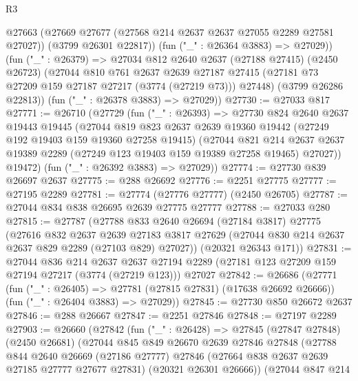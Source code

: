 \begin{lexlean}{R3}
\begin{coremodule}
        @27663
          (@27669 @27677 (@27568 @214 @2637 @2637 @27055 @2289 @27581 @27027))
          (@3799 @26301 @22817))
        (fun ("_" : @26364 @3883) => @27029))
      (fun ("_" : @26379) =>
      @27034
        @812
        @2640
        @2637
        (@27188 @27415)
        (@2450 @26723)
        (@27044
          @810
          @761
          @2637
          @2639
          @27187
          @27415
          (@27181 @73 @27209 @159 @27187 @27217 (@3774 (@27219 @73)))
          @27448)
        (@3799 @26286 @22813))
      (fun ("_" : @26378 @3883) => @27029))
@27730 := @27033 @817
@27771 := @26710
    (@27729
      (fun ("_" : @26393) =>
      @27730
        @824
        @2640
        @2637
        @19443
        @19445
        (@27044
          @819
          @823
          @2637
          @2639
          @19360
          @19442
          (@27249 @192 @19403 @159 @19360 @27258 @19415)
          (@27044
            @821
            @214
            @2637
            @2637
            @19389
            @2289
            (@27249 @123 @19403 @159 @19389 @27258 @19465)
            @27027))
        @19472)
      (fun ("_" : @26392 @3883) => @27029))
@27774 := @27730 @839 @26697 @2637
@27775 := @288 @26692
@27776 := @2251 @27775
@27777 := @27195 @2289
@27781 := @27774 (@27776 @27777) (@2450 @26705)
@27787 := @27044 @834 @838 @26695 @2639 @27775 @27777
@27788 := @27033 @280
@27815 := @27787
    (@27788
      @833
      @2640
      @26694
      (@27184 @3817)
      @27775
      (@27616
        @832
        @2637
        @2639
        @27183
        @3817
        @27629
        (@27044 @830 @214 @2637 @2637 @829 @2289 (@27103 @829) @27027))
      (@20321 @26343 @171))
@27831 := @27044
    @836
    @214
    @2637
    @2637
    @27194
    @2289
    (@27181 @123 @27209 @159 @27194 @27217 (@3774 (@27219 @123)))
    @27027
@27842 := @26686
    (@27771
      (fun ("_" : @26405) => @27781 (@27815 @27831) (@17638 @26692 @26666))
      (fun ("_" : @26404 @3883) => @27029))
@27845 := @27730 @850 @26672 @2637
@27846 := @288 @26667
@27847 := @2251 @27846
@27848 := @27197 @2289
@27903 := @26660
    (@27842
      (fun ("_" : @26428) =>
      @27845
        (@27847 @27848)
        (@2450 @26681)
        (@27044
          @845
          @849
          @26670
          @2639
          @27846
          @27848
          (@27788
            @844
            @2640
            @26669
            (@27186 @27777)
            @27846
            (@27664 @838 @2637 @2639 @27185 @27777 @27677 @27831)
            (@20321 @26301 @26666))
          (@27044
            @847
            @214

\end{coremodule}
\end{lexlean}
